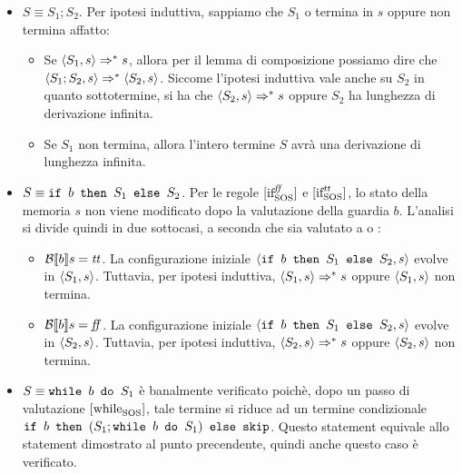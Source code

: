 \begin{itemize}
  \item $S \equiv{} S_1; S_2$. Per ipotesi induttiva, sappiamo che $S_1$ o
  termina in $s$ oppure non termina affatto:
  \begin{itemize}
    \item Se $\confSs{S_1}{s} \Rar{*} s$, allora per il lemma di composizione
      possiamo dire che $\confSs{S_1;S_2}{s} \Rar{*} \confSs{S_2}{s}$. Siccome
      l'ipotesi induttiva vale anche su $S_2$ in quanto sottotermine, si ha che
      $\confSs{S_2}{s} \Rar{*} s$ oppure $S_2$ ha lunghezza di derivazione
      infinita.
    \item Se $S_1$ non termina, allora l'intero termine $S$ avrà una
      derivazione di lunghezza infinita.
  \end{itemize}

  \item $S \equiv{} \ifABC{b}{S_1}{S_2}$. Per le regole $\ifffSOS{}$ e
    $\ifttSOS{}$, lo stato della memoria $s$ non viene modificato dopo la
    valutazione della guardia $b$. L'analisi si divide quindi in due sottocasi,
    a seconda che  sia valutato a \semtrue{} o \semfalse{}:
    \begin{itemize}
      \item $\B{b} = \semtrue{}$. La configurazione iniziale
        $\confSs{\ifABC{b}{S_1}{S_2}}{s}$ evolve in
        $\confSs{S_1}{s}$. Tuttavia, per ipotesi induttiva,
        $\confSs{S_1}{s} \Rar{*} s$ oppure $\confSs{S_1}{s}$ non termina.
      \item $\B{b} = \semfalse{}$. La configurazione iniziale
        $\confSs{\ifABC{b}{S_1}{S_2}}{s}$ evolve in
        $\confSs{S_2}{s}$. Tuttavia, per ipotesi induttiva,
        $\confSs{S_2}{s} \Rar{*} s$ oppure $\confSs{S_2}{s}$ non termina.
    \end{itemize}

  \item $S \equiv{} \wbS{b}{S_1}$ è banalmente verificato poichè, dopo un passo
    di valutazione $\whileSOS$, tale termine si riduce ad un termine condizionale
    $\ifABC{b}{(S_1;\wbS{b}{S_1})}{\skipForFriends}$. Questo statement equivale
    allo statement dimostrato al punto precendente, quindi anche questo caso è 
    verificato.
\end{itemize}

\let\stmm\undefined
{}
